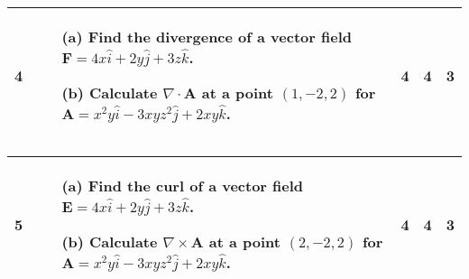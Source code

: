 \documentclass[a4paper,12pt]{article}
\begin{document}
\begin{center}
\begin{tabular}{|p{0.5cm}|p{13cm}|c|p{0.5cm}|p{0.5cm}|}
\begin{center} \textbf{4} \end{center}	&  
\begin{enumerate}
\item[(a)]  Find the divergence of a vector field $\mathbf{F} = 4x \hat{i} + 2y \hat{j} + 3z \hat{k}$. 

\item[(b)] Calculate $\nabla \cdot \mathbf{A}$ at a point $(1, -2, 2)$ for $\mathbf{A} = x^2y \hat{i} - 3xyz^2 \hat{j} + 2xy \hat{k}$. 
\end{enumerate} & \textbf{4} & \textbf{4} & \textbf{3} \\

\hline

\end{tabular}
\end{center}

\begin{center}
\begin{tabular}{|p{0.5cm}|p{13cm}|c|p{0.5cm}|p{0.5cm}|}
\hline

\begin{center} \textbf{5} \end{center}	& 
\begin{enumerate}
\item[(a)] Find the curl of a vector field $\mathbf{E} = 4x \hat{i} + 2y \hat{j} + 3z \hat{k}$.

\item[(b)] Calculate $\nabla \times \mathbf{A}$ at a point $(2, -2, 2)$ for $\mathbf{A} = x^2y \hat{i} - 3xyz^2 \hat{j} + 2xy \hat{k}$.
\end{enumerate} & \textbf{4} & \textbf{4} & \textbf{3} \\

\hline

\end{tabular}
\end{center}
	
	
\end{document}
